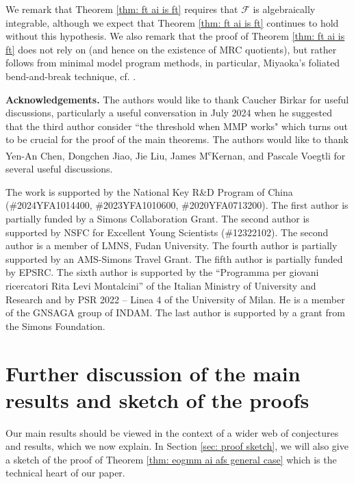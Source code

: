 \documentclass[12pt]{amsart}
\numberwithin{equation}{section}
\newcommand{\Ff}{\mathcal{F}}
\theoremstyle{definition}
\theoremstyle{definition}
\theoremstyle{definition}
\begin{document}
We remark that Theorem \ref{thm: ft ai is ft} requires that $\Ff$ is algebraically integrable, although we expect that Theorem \ref{thm: ft ai is ft} continues to hold without this hypothesis. We also remark that 
the proof of Theorem \ref{thm: ft ai is ft} does not rely on \cite{CP19} (and hence on the existence of MRC quotients), but rather follows from minimal model program methods, in particular, Miyaoka's foliated bend-and-break technique, cf. \cite[Corollary 2.28]{Spi20}.




\medskip 

\noindent\textbf{Acknowledgements.} The authors would like to thank Caucher Birkar for useful discussions, particularly a useful conversation in July 2024 when he suggested that the third author consider ``the threshold when MMP works" which turns out to be crucial for the proof of the main theorems. The authors would like to thank  Yen-An Chen, Dongchen Jiao, Jie Liu, James M\textsuperscript{c}Kernan, and Pascale Voegtli for several useful discussions.

The work is supported by the National Key R\&D Program of China (\#2024YFA1014400, \#2023YFA1010600, \#2020YFA0713200). The first author is partially funded by a Simons Collaboration Grant.  The second author is supported by NSFC for Excellent Young Scientists (\#12322102). The second author is a member of LMNS, Fudan University. The fourth author is partially supported by an AMS-Simons Travel Grant.
The fifth author is partially funded by EPSRC.
The sixth author is supported by the “Programma per giovani ricercatori Rita Levi Montalcini” of the Italian Ministry of University and Research and by PSR 2022 – Linea 4 of the University of Milan. He is a member of the GNSAGA group of INDAM. The last author is supported by a grant from the Simons Foundation.





\section{Further discussion of the main results and sketch of the proofs}

Our main results should be viewed in the context of a wider web of conjectures and results, which we now explain. In Section \ref{sec: proof sketch}, we will also give a sketch of the proof of Theorem \ref{thm: eogmm ai afs general case} which is the technical heart of our paper.
\end{document}
